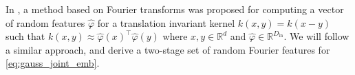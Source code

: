 \documentclass[english]{article}
\theoremstyle{plain}
\theoremstyle{plain}
\newcommand{\factor}{f}				%
\newcommand{\outV}{V}                         %
\newcommand{\approxMsg}[3]{M_{#1 \rightarrow #2}^{#3}}			%
\begin{document}


In \cite{Rahimi2007}, a method based on Fourier transforms was proposed for computing a vector
of random features $\hat{\varphi}$ for a translation invariant kernel $k(x,y) = k(x-y)$
 such that $k(x, y) \approx \hat{\varphi}(x)^\top \hat{\varphi}(y)$
where $x,y \in \mathbb{R}^d$ and $\hat{\varphi} \in \mathbb{R}^{D_\mathrm{in}}$.  
We will follow a similar approach, and derive 
a two-stage set of random Fourier features for \eqref{eq:gauss_joint_emb}.
\end{document}
